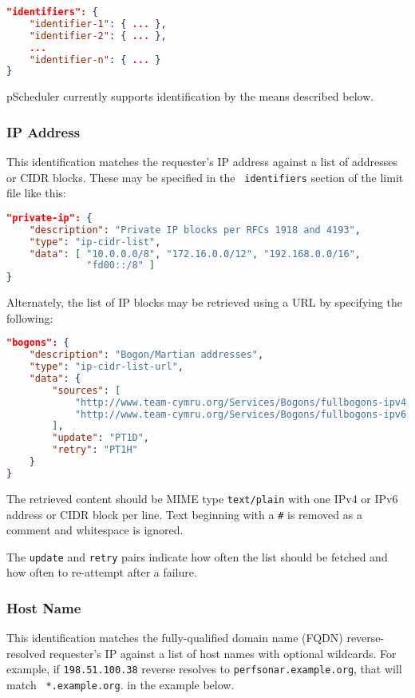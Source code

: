 \documentclass[10pt,titlepage]{article}
\begin{document}
\begin{lstlisting}[language=json]
"identifiers": {
    "identifier-1": { ... },
    "identifier-2": { ... },
    ...
    "identifier-n": { ... }
}
\end{lstlisting}

pScheduler currently supports identification by the means described
below.


\subsubsection{IP Address}

This identification matches the requester's IP address against a list
of addresses or CIDR blocks.  These may be specified in the {\tt
  identifiers} section of the limit file like this:

\begin{lstlisting}[language=json]
"private-ip": {
    "description": "Private IP blocks per RFCs 1918 and 4193",
    "type": "ip-cidr-list",
    "data": [ "10.0.0.0/8", "172.16.0.0/12", "192.168.0.0/16",
              "fd00::/8" ]
}
\end{lstlisting}

Alternately, the list of IP blocks may be retrieved using a URL by
specifying the following:

\begin{lstlisting}[language=json]
"bogons": {
    "description": "Bogon/Martian addresses",
    "type": "ip-cidr-list-url",
    "data": {
        "sources": [
            "http://www.team-cymru.org/Services/Bogons/fullbogons-ipv4.txt",
            "http://www.team-cymru.org/Services/Bogons/fullbogons-ipv6.txt"
        ],
        "update": "PT1D",
        "retry": "PT1H"
    }
}
\end{lstlisting}

The retrieved content should be MIME type {\tt text/plain} with one
IPv4 or IPv6 address or CIDR block per line.  Text beginning with a
{\tt \#} is removed as a comment and whitespace is ignored.

The {\tt update} and {\tt retry} pairs indicate how often the list
should be fetched and how often to re-attempt after a failure.


\subsubsection{Host Name}

This identification matches the fully-qualified domain name (FQDN)
reverse-resolved requester's IP against a list of host names with
optional wildcards.  For example, if {\tt 198.51.100.38} reverse
resolves to {\tt perfsonar.example.org}, that will match {\tt
  *.example.org}. in the example below.
\end{document}
